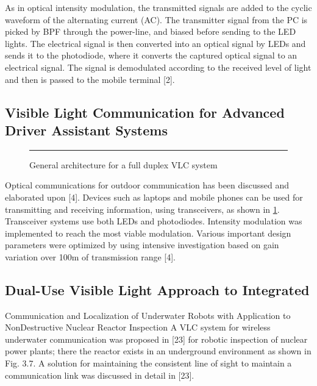 As in optical intensity modulation, the transmitted signals are added to the cyclic
waveform of the alternating current (AC). The transmitter signal from the PC is picked
by BPF through the power-line, and biased before sending to the LED lights. The
electrical signal is then converted into an optical signal by LEDs and sends it to the
photodiode, where it converts the captured optical signal to an electrical signal. The
signal is demodulated according to the received level of light and then is passed to the
mobile terminal [2].

\subsection{Visible Light Communication for Advanced Driver Assistant Systems}

\begin{figure}[htbp]
  \centering
    \rule{35em}{0.5pt}
  \caption[General architecture for a full duplex VLC system ]{General architecture for a full duplex VLC system }
  \label{fig:vlc-driver}
\end{figure}

Optical communications for outdoor communication has been discussed and elaborated
upon [4]. Devices such as laptops and mobile phones can be used for transmitting and
receiving information, using transceivers, as shown in \ref{fig:vlc-driver}. Transceiver systems use
both LEDs and photodiodes. Intensity modulation was implemented to reach the most
viable modulation. Various important design parameters were optimized by using
intensive investigation based on gain variation over 100m of transmission range [4]. 


\subsection{Dual-Use Visible Light Approach to Integrated}

Communication and Localization of Underwater Robots with
Application to NonDestructive Nuclear Reactor Inspection
A VLC system for wireless underwater communication was proposed in [23] for robotic
inspection of nuclear power plants; there the reactor exists in an underground
environment as shown in Fig. 3.7. A solution for maintaining the consistent line of sight
to maintain a communication link was discussed in detail in [23].

